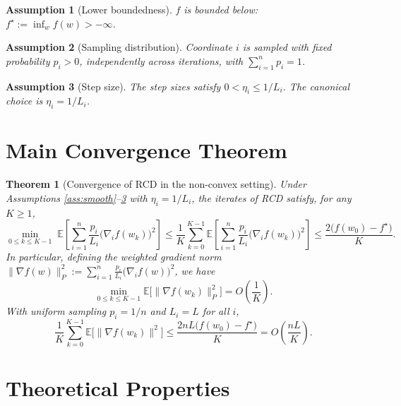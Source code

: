 \documentclass{article}
\newtheorem{theorem}{Theorem}
\newtheorem{assumption}{Assumption}
\begin{document}
\begin{assumption}[Lower boundedness]
\label{ass:lb}
$f$ is bounded below: $f^\star := \inf_{w} f(w) > -\infty$.
\end{assumption}

\begin{assumption}[Sampling distribution]
\label{ass:prob}
Coordinate $i$ is sampled with fixed probability $p_i > 0$, independently across
iterations, with $\sum_{i=1}^n p_i = 1$.
\end{assumption}

\begin{assumption}[Step size]
\label{ass:step}
The step sizes satisfy $0 < \eta_i \le 1/L_i$. The canonical choice is
$\eta_i = 1/L_i$.
\end{assumption}

\section*{Main Convergence Theorem}

\begin{theorem}[Convergence of RCD in the non-convex setting]
\label{thm:main}
Under Assumptions \ref{ass:smooth}--\ref{ass:step} with $\eta_i = 1/L_i$, the iterates
of RCD satisfy, for any $K \ge 1$,
\[
\min_{0 \le k \le K-1}\; \mathbb{E}\!\left[ \sum_{i=1}^n \frac{p_i}{L_i}
\big(\nabla_i f(w_k)\big)^2 \right]
\le \frac{1}{K} \sum_{k=0}^{K-1} \mathbb{E}\!\left[ \sum_{i=1}^n \frac{p_i}{L_i}
\big(\nabla_i f(w_k)\big)^2 \right]
\le \frac{2\big(f(w_0) - f^\star\big)}{K}.
\]
In particular, defining the weighted gradient norm
$\|\nabla f(w)\|_{P}^2 := \sum_{i=1}^n \frac{p_i}{L_i}\big(\nabla_i f(w)\big)^2$,
we have
\[
\min_{0 \le k \le K-1} \mathbb{E}\big[\|\nabla f(w_k)\|_P^2\big]
= O\!\left(\frac{1}{K}\right).
\]
With uniform sampling $p_i = 1/n$ and $L_i = L$ for all $i$,
\[
\frac{1}{K}\sum_{k=0}^{K-1} \mathbb{E}\big[\|\nabla f(w_k)\|^2\big]
\le \frac{2nL\big(f(w_0) - f^\star\big)}{K}
= O\!\left(\frac{nL}{K}\right).
\]
\end{theorem}

\section*{Theoretical Properties}
\end{document}
